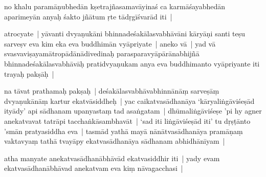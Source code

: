 \documentclass[article,12pt,a4paper]{memoir}
\newcommand{\gap}[1]{}
\begin{document}
	  \pstart no khalu paramāṇubhedān kṣetrajñasamavāyinaś ca karmāśayabhedān aparimeyān anyaḥ śakto jñātum ṛte tādṛgīśvarād\label{ratnakīrtinibandhāvali__36r1NJ1HHMVH5RR7U2GTVWCF63V} iti |
	\pend
      

	  \pstart atrocyate | yāvanti dvyaṇukāni bhinnadeśakālasvabhāvāni kāryāṇi santi teṣu sarveṣv eva kim eka eva buddhimān vyāpriyate | aneko vā | yad vā svasvaviṣayamātropādānādivedinaḥ parasparavyāpārānabhijñā bhinnadeśakālasvabhāvāḥ pratidvyaṇukam anya eva buddhimanto vyāpriyante iti trayaḥ pakṣāḥ |
	\pend
      

	  \pstart na tāvat \label{ratnakīrtinibandhāvali__36r1NM7W6RLH3UQ01ZEG4Q53FWC}prathamaḥ pakṣaḥ |\label{ratnakīrtinibandhāvali__36r1NM7W6SG03AESJNSHQ1FK1L5} de\gap{}śakālasvabhāvabhinnānāṃ sarveṣāṃ dvyaṇukānāṃ kartur ekatvāsiddheḥ | yac caikatvasādhanāya ‘kāryaliṅgāviśeṣād ityādy’ api sādhanam upanyastaṃ tad asaṅgatam | dhūmaliṅgāviśeṣe 'pi hy agner anekatvavat tatrāpi tacchaṅkāsambhavāt | ‘\label{ratnakīrtinibandhāvali__36r1NSAWNTV0PU093F550ENXSD2}sad iti liṅgāviśeṣād\label{ratnakīrtinibandhāvali__36r1NSAWNTWQ48AKDPN5RIVJIC3} iti’ tu dṛṣṭānto 'smān pratyasiddha eva | tasmād yathā mayā nānātvasādhanāya pramāṇaṃ vaktavyaṃ tathā tvayāpy ekatvasādhanāya sādhanam abhidhānīyam |
	\pend
      

	  \pstart atha manyate anekatvasādhanābhāvād ekatvasiddhir iti | yady evam ekatvasādhanābhāvad anekatvam eva kiṃ nāvagacchasi |
	\pend
      
\end{document}
